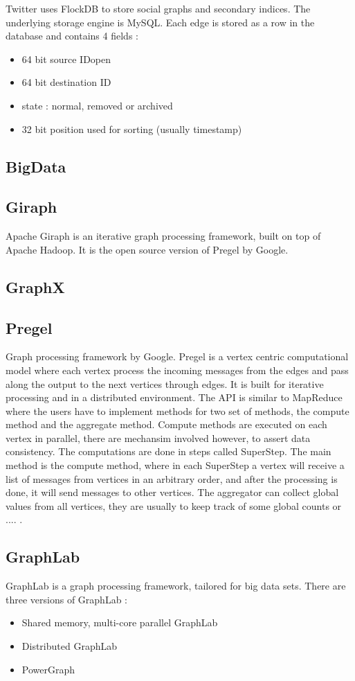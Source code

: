 \documentclass[english]{tktltiki}
\begin{document}
Twitter uses FlockDB to store social graphs and secondary indices. The underlying storage engine is MySQL. Each edge is stored as a row in the database and contains 4 fields :
\begin{itemize}
\item
64 bit source IDopen	
\item
64 bit destination ID
\item
state : normal, removed or archived
\item
32 bit position used for sorting (usually timestamp)
\end{itemize}

\subsection{BigData} 
\subsection{Giraph}
Apache Giraph is an iterative graph processing framework, built on top of Apache Hadoop. It is the open source version of Pregel by Google. 
\subsection{GraphX}
\subsection{Pregel}
Graph processing framework by Google. Pregel is a vertex centric computational model where each vertex process the incoming messages from the edges and pass along the output to the next vertices through edges. It is built for iterative processing and in a distributed environment. The API is similar to MapReduce where the users have to implement methods for two set of methods, the compute method and the aggregate method. Compute methods are executed on each vertex in parallel, there are mechansim involved however, to assert data consistency. The computations are done in steps called SuperStep. The main method is the compute method, where in each SuperStep a vertex will receive a list of messages from vertices in an arbitrary order, and after the processing is done, it will send messages to other vertices. The aggregator can collect global values from all vertices, they are usually  to keep track of some global counts or .... . 
\subsection{GraphLab}
GraphLab is a graph processing framework, tailored for big data sets. There are three versions of GraphLab :
\begin{itemize}
\item
Shared memory, multi-core parallel GraphLab
\item
Distributed GraphLab
\item
PowerGraph

\end{itemize} 
\end{document}
